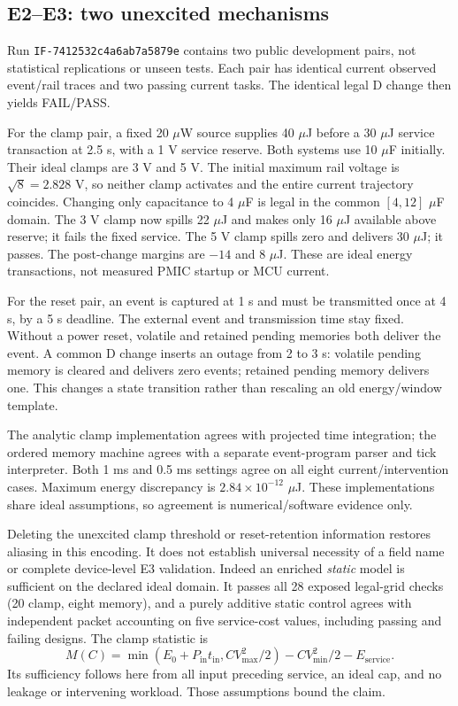 \subsection{E2--E3: two unexcited mechanisms}
Run \texttt{IF-7412532c4a6ab7a5879e} contains two public development pairs, not statistical replications or unseen tests. Each pair has identical current observed event/rail traces and two passing current tasks. The identical legal D change then yields FAIL/PASS.

For the clamp pair, a fixed 20 $\mu$W source supplies 40 $\mu$J before a 30 $\mu$J service transaction at 2.5 s, with a 1 V service reserve. Both systems use 10 $\mu$F initially. Their ideal clamps are 3 V and 5 V. The initial maximum rail voltage is $\sqrt{8}=2.828$ V, so neither clamp activates and the entire current trajectory coincides. Changing only capacitance to 4 $\mu$F is legal in the common $[4,12]$ $\mu$F domain. The 3 V clamp now spills 22 $\mu$J and makes only 16 $\mu$J available above reserve; it fails the fixed service. The 5 V clamp spills zero and delivers 30 $\mu$J; it passes. The post-change margins are $-14$ and $8$ $\mu$J. These are ideal energy transactions, not measured PMIC startup or MCU current.

For the reset pair, an event is captured at 1 s and must be transmitted once at 4 s, by a 5 s deadline. The external event and transmission time stay fixed. Without a power reset, volatile and retained pending memories both deliver the event. A common D change inserts an outage from 2 to 3 s: volatile pending memory is cleared and delivers zero events; retained pending memory delivers one. This changes a state transition rather than rescaling an old energy/window template.

The analytic clamp implementation agrees with projected time integration; the ordered memory machine agrees with a separate event-program parser and tick interpreter. Both 1 ms and 0.5 ms settings agree on all eight current/intervention cases. Maximum energy discrepancy is $2.84\times 10^{-12}$ $\mu$J. These implementations share ideal assumptions, so agreement is numerical/software evidence only.

Deleting the unexcited clamp threshold or reset-retention information restores aliasing in this encoding. It does not establish universal necessity of a field name or complete device-level E3 validation. Indeed an enriched \emph{static} model is sufficient on the declared ideal domain. It passes all 28 exposed legal-grid checks (20 clamp, eight memory), and a purely additive static control agrees with independent packet accounting on five service-cost values, including passing and failing designs. The clamp statistic is
\[
 M(C)=\min(E_0+P_{\mathrm{in}}t_{\mathrm{in}},CV_{\max}^2/2)-CV_{\min}^2/2-E_{\mathrm{service}}.
\]
Its sufficiency follows here from all input preceding service, an ideal cap, and no leakage or intervening workload. Those assumptions bound the claim.


